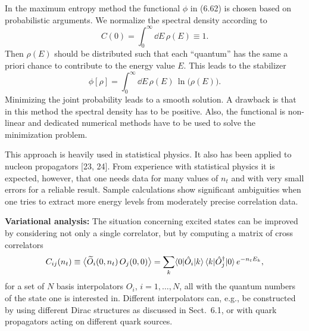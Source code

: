 In the maximum entropy method the functional $\phi$ in (6.62) is chosen based
on probabilistic arguments. We normalize the spectral density according to
\begin{equation}
  C(0) = \int_0^\infty \dd E\, \rho(E) \equiv 1 .
\end{equation}
Then $\rho(E)$ should be distributed such that each ``quantum'' has the same a
priori chance to contribute to the energy value $E$. This leads to the
stabilizer
\begin{equation}
  \phi[\rho] = \int_0^\infty \dd E\, \rho(E)\, \ln\!\big( \rho(E) \big) .
\end{equation}
Minimizing the joint probability leads to a smooth solution. A drawback is that
in this method the spectral density has to be positive. Also, the functional is
non-linear and dedicated numerical methods have to be used to solve the
minimization problem.

This approach is heavily used in statistical physics. It also has been applied
to nucleon propagators [23, 24]. From experience with statistical physics it is
expected, however, that one needs data for many values of $n_t$ and with very
small errors for a reliable result. Sample calculations show significant
ambiguities when one tries to extract more energy levels from moderately
precise correlation data.

\textbf{Variational analysis:} The situation concerning excited states can be
improved by considering not only a single correlator, but by computing a matrix
of cross correlators
\begin{equation}
  C_{ij}(n_t) \equiv \big\langle \widetilde{O}_i(0, n_t)\, O_j(0, 0) \big\rangle
  = \sum_k \langle0|\hat{O}_i|k\rangle\,\langle k|\hat{O}_j^\dagger|0\rangle\,
    e^{-n_t E_k} ,
\end{equation}
for a set of $N$ basis interpolators $O_i$, $i = 1, \ldots, N$, all with the
quantum numbers of the state one is interested in. Different interpolators can,
e.g., be constructed by using different Dirac structures as discussed in
Sect.~6.1, or with quark propagators acting on different quark sources.

